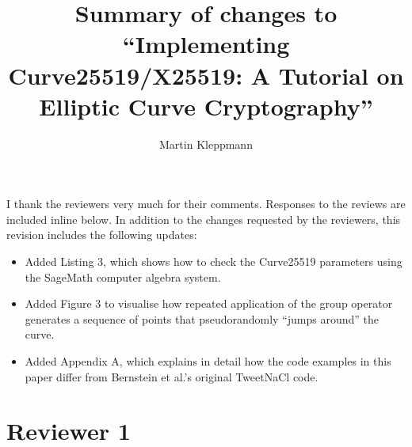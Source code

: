 \documentclass[10pt]{article}
\begin{document}
\title{Summary of changes to ``Implementing Curve25519/X25519: A Tutorial on Elliptic Curve Cryptography''}
\author{Martin Kleppmann}
\date{}
\maketitle

I thank the reviewers very much for their comments.
Responses to the reviews are included inline below.
In addition to the changes requested by the reviewers, this revision includes the following updates:
\begin{itemize}
\item Added Listing 3, which shows how to check the Curve25519 parameters using the SageMath computer algebra system.
\item Added Figure 3 to visualise how repeated application of the group operator generates a sequence of points that pseudorandomly ``jumps around'' the curve.
\item Added Appendix A, which explains in detail how the code examples in this paper differ from Bernstein et al.'s original TweetNaCl code.
\end{itemize}

\section{Reviewer 1}
\end{document}
